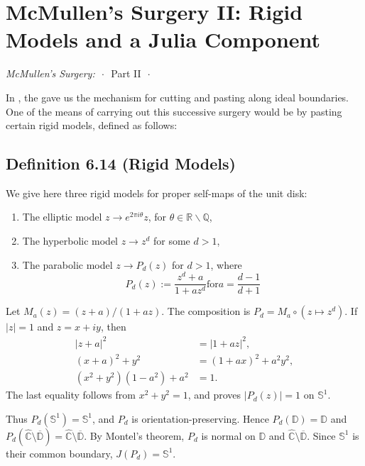 \documentclass[11pt,a4paper]{article}
\begin{document}
\section*{McMullen's Surgery II: Rigid Models and a Julia Component}
\begin{center}
\emph{McMullen's Surgery:}
 \(\,\cdot\,\) Part II \(\,\cdot\,\)
\end{center}

In , the  gave us the mechanism for cutting and pasting along ideal boundaries. One of the means of carrying out this successive surgery would be by pasting certain rigid models, defined as follows:

    \subsection*{Definition 6.14 (Rigid Models)} We give here three rigid models for proper self-maps of the unit disk:
    \begin{enumerate}
        \item The elliptic model $z\rightarrow e^{2\pi i\theta}z$, for $\theta \in \mathbb{R}\backslash \mathbb{Q}$,
        \item The hyperbolic model $z\rightarrow z^d$ for some $d>1$,
        \item The parabolic model $z \rightarrow P_d(z)$ for $d>1$, where
        $$P_d(z):= \frac{z^d + a}{1+az^d}   \text{for}   a = \frac{d-1}{d+1}$$
    \end{enumerate}

    Let $M_a(z)=(z+a)/(1+az)$. The composition is $P_d=M_a\circ(z\mapsto z^d)$. If $|z|=1$ and $z=x+iy$, then
    \[
    \begin{aligned}
    |z+a|^2&=|1+az|^2,\\
    (x+a)^2+y^2&=(1+ax)^2+a^2y^2,\\
    (x^2+y^2)(1-a^2)+a^2&=1.
    \end{aligned}
    \]
    The last equality follows from $x^2+y^2=1$, and proves $|P_d(z)|=1$ on $\mathbb S^1$.

    Thus $P_d(\mathbb{S}^1)=\mathbb{S}^1$, and $P_d$ is orientation-preserving. Hence $P_d(\mathbb{D})=\mathbb{D}$ and $P_d(\widehat{\mathbb{C}}\setminus\overline{\mathbb{D}})=\widehat{\mathbb{C}}\setminus\overline{\mathbb{D}}$. By Montel's theorem, $P_d$ is normal on $\mathbb{D}$ and $\widehat{\mathbb{C}}\setminus\overline{\mathbb{D}}$. Since $\mathbb{S}^1$ is their common boundary, $J(P_d)=\mathbb{S}^1$.
\end{document}
